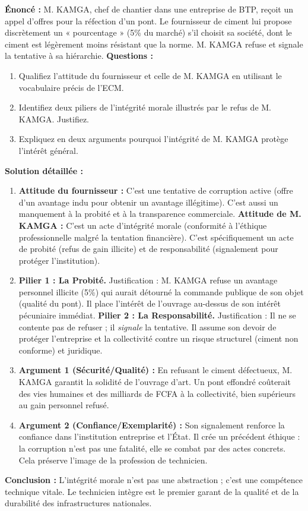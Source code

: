 \documentclass[11pt]{article}
\newcommand{\cle}[1]{{\popxbold\color{popdark}#1}}
\begin{document}
\begin{exoresolu}
    \textbf{Énoncé :} M. KAMGA, chef de chantier dans une entreprise de BTP, reçoit un appel d'offres pour la réfection d'un pont. Le fournisseur de ciment lui propose discrètement un « pourcentage » (5\% du marché) s'il choisit sa société, dont le ciment est légèrement moins résistant que la norme. M. KAMGA refuse et signale la tentative à sa hiérarchie.
    \textbf{Questions :}
    \begin{enumerate}
        \item Qualifiez l'attitude du fournisseur et celle de M. KAMGA en utilisant le vocabulaire précis de l'ECM.
        \item Identifiez deux piliers de l'intégrité morale illustrés par le refus de M. KAMGA. Justifiez.
        \item Expliquez en deux arguments pourquoi l'intégrité de M. KAMGA protège l'intérêt général.
    \end{enumerate}
    \tcblower
    \textbf{Solution détaillée :}
    \begin{enumerate}
        \item \textbf{Attitude du fournisseur :} C'est une tentative de \cle{corruption active} (offre d'un avantage indu pour obtenir un avantage illégitime). C'est aussi un manquement à la \cle{probité} et à la \cle{transparence} commerciale.
            \textbf{Attitude de M. KAMGA :} C'est un acte d'\cle{intégrité morale} (conformité à l'éthique professionnelle malgré la tentation financière). C'est spécifiquement un acte de \cle{probité} (refus de gain illicite) et de \cle{responsabilité} (signalement pour protéger l'institution).
        \item \textbf{Pilier 1 : La Probité.} Justification : M. KAMGA refuse un avantage personnel illicite (5\%) qui aurait détourné la commande publique de son objet (qualité du pont). Il place l'intérêt de l'ouvrage au-dessus de son intérêt pécuniaire immédiat.
            \textbf{Pilier 2 : La Responsabilité.} Justification : Il ne se contente pas de refuser ; il \emph{signale} la tentative. Il assume son devoir de protéger l'entreprise et la collectivité contre un risque structurel (ciment non conforme) et juridique.
        \item \textbf{Argument 1 (Sécurité/Qualité) :} En refusant le ciment défectueux, M. KAMGA garantit la \cle{solidité de l'ouvrage d'art}. Un pont effondré coûterait des vies humaines et des milliards de FCFA à la collectivité, bien supérieurs au gain personnel refusé.
        \item \textbf{Argument 2 (Confiance/Exemplarité) :} Son signalement renforce la \cle{confiance} dans l'institution entreprise et l'État. Il crée un \cle{précédent éthique} : la corruption n'est pas une fatalité, elle se combat par des actes concrets. Cela préserve l'image de la profession de technicien.
    \end{enumerate}
    \textbf{Conclusion :} L'intégrité morale n'est pas une abstraction ; c'est une compétence technique vitale. Le technicien intègre est le premier garant de la qualité et de la durabilité des infrastructures nationales.
\end{exoresolu}
\end{document}
